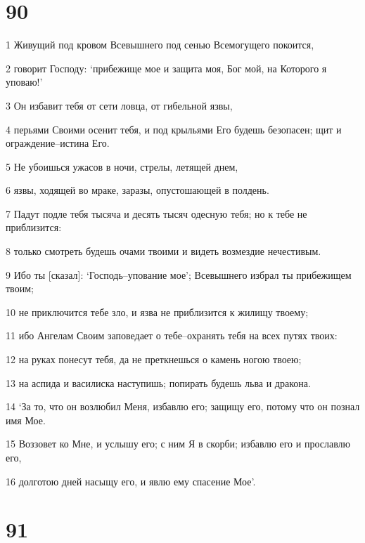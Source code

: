 \chapter{90}

\par 1 Живущий под кровом Всевышнего под сенью Всемогущего покоится,
\par 2 говорит Господу: `прибежище мое и защита моя, Бог мой, на Которого я уповаю!'
\par 3 Он избавит тебя от сети ловца, от гибельной язвы,
\par 4 перьями Своими осенит тебя, и под крыльями Его будешь безопасен; щит и ограждение--истина Его.
\par 5 Не убоишься ужасов в ночи, стрелы, летящей днем,
\par 6 язвы, ходящей во мраке, заразы, опустошающей в полдень.
\par 7 Падут подле тебя тысяча и десять тысяч одесную тебя; но к тебе не приблизится:
\par 8 только смотреть будешь очами твоими и видеть возмездие нечестивым.
\par 9 Ибо ты [сказал]: `Господь--упование мое'; Всевышнего избрал ты прибежищем твоим;
\par 10 не приключится тебе зло, и язва не приблизится к жилищу твоему;
\par 11 ибо Ангелам Своим заповедает о тебе--охранять тебя на всех путях твоих:
\par 12 на руках понесут тебя, да не преткнешься о камень ногою твоею;
\par 13 на аспида и василиска наступишь; попирать будешь льва и дракона.
\par 14 `За то, что он возлюбил Меня, избавлю его; защищу его, потому что он познал имя Мое.
\par 15 Воззовет ко Мне, и услышу его; с ним Я в скорби; избавлю его и прославлю его,
\par 16 долготою дней насыщу его, и явлю ему спасение Мое'.

\chapter{91}

